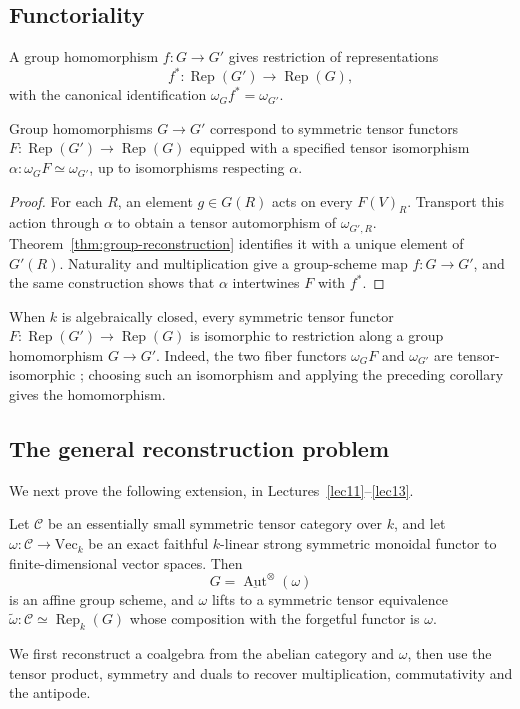 \subsection*{Functoriality}
A group homomorphism $f:G\to G'$ gives restriction of representations
\[
 f^*:\operatorname{Rep}(G')\longrightarrow\operatorname{Rep}(G),
\]
with the canonical identification $\omega_Gf^*=\omega_{G'}$.
\begin{corollary}
Group homomorphisms $G\to G'$ correspond to symmetric tensor functors $F:\operatorname{Rep}(G')\to\operatorname{Rep}(G)$ equipped with a specified tensor isomorphism $\alpha:\omega_GF\simeq\omega_{G'}$, up to isomorphisms respecting $\alpha$.
\end{corollary}
\begin{proof}
For each $R$, an element $g\in G(R)$ acts on every $F(V)_R$. Transport this action through $\alpha$ to obtain a tensor automorphism of $\omega_{G',R}$. Theorem~\ref{thm:group-reconstruction} identifies it with a unique element of $G'(R)$. Naturality and multiplication give a group-scheme map $f:G\to G'$, and the same construction shows that $\alpha$ intertwines $F$ with $f^*$.
\end{proof}

When $k$ is algebraically closed, every symmetric tensor functor
$F:\operatorname{Rep}(G')\to\operatorname{Rep}(G)$ is isomorphic to
restriction along a group homomorphism $G\to G'$. Indeed, the two fiber
functors $\omega_GF$ and $\omega_{G'}$ are tensor-isomorphic
\cite[Corollary 1.2]{WibmerTorsors}; choosing such an isomorphism and applying
the preceding corollary gives the homomorphism.

\subsection*{The general reconstruction problem}
We next prove the following extension, in Lectures~\ref{lec11}--\ref{lec13}.
\begin{theorem}\label{thm:neutral-tannaka}
Let $\mathcal C$ be an essentially small symmetric tensor category over $k$, and let $\omega:\mathcal C\to\mathrm{Vec}_k$ be an exact faithful $k$-linear strong symmetric monoidal functor to finite-dimensional vector spaces. Then
\[
 G=\underline{\operatorname{Aut}}^{\otimes}(\omega)
\]
is an affine group scheme, and $\omega$ lifts to a symmetric tensor equivalence $\widetilde\omega:\mathcal C\simeq\operatorname{Rep}_k(G)$ whose composition with the forgetful functor is $\omega$.
\end{theorem}
We first reconstruct a coalgebra from the abelian category and $\omega$, then use the tensor product, symmetry and duals to recover multiplication, commutativity and the antipode.

